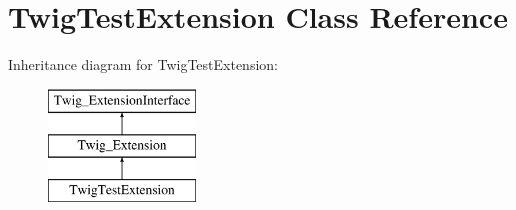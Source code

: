 \hypertarget{classTwigTestExtension}{}\section{Twig\+Test\+Extension Class Reference}
\label{classTwigTestExtension}
Inheritance diagram for Twig\+Test\+Extension\+:\begin{figure}[H]
\begin{center}
\leavevmode
\includegraphics[height=3.000000cm]{classTwigTestExtension}
\end{center}
\end{figure}
